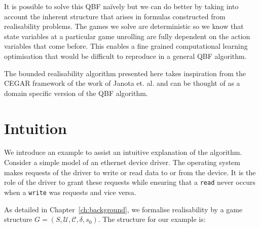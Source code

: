 It is possible to solve this QBF na\"ively but we can do better by taking into account the inherent structure that arises in formulas constructed from realisability problems. The games we solve are deterministic so we know that state variables at a particular game unrolling are fully dependent on the action variables that come before. This enables a fine grained computational learning optimisation that would be difficult to reproduce in a general QBF algorithm.

The bounded realisability algorithm presented here takes inspiration from the CEGAR framework of the work of Janota et. al. and can be thought of as a domain specific version of the QBF algorithm.

\section{Intuition}

We introduce an example to assist an intuitive explanation of the algorithm. Consider a simple model of an ethernet device driver. The operating system makes requests of the driver to write or read data to or from the device. It is the role of the driver to grant these requests while ensuring that a \texttt{read} never occurs when a \texttt{write} was requests and vice versa.

As detailed in Chapter~\ref{ch:background}, we formalise realisability by a game structure $G = (S, \mathcal{U}, \mathcal{C}, \delta, s_0)$. The structure for our example is:

